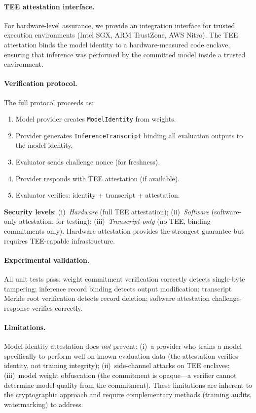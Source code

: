 \documentclass[11pt]{article}
\begin{document}
\paragraph{TEE attestation interface.}
For hardware-level assurance, we provide an integration interface
for trusted execution environments (Intel SGX, ARM TrustZone,
AWS Nitro).  The TEE attestation binds the model identity to a
hardware-measured code enclave, ensuring that inference was performed
by the committed model inside a trusted environment.

\paragraph{Verification protocol.}
The full protocol proceeds as:
\begin{enumerate}[nosep]
\item Model provider creates \texttt{ModelIdentity} from weights.
\item Provider generates \texttt{InferenceTranscript} binding
  all evaluation outputs to the model identity.
\item Evaluator sends challenge nonce (for freshness).
\item Provider responds with TEE attestation (if available).
\item Evaluator verifies: identity $+$ transcript $+$ attestation.
\end{enumerate}

\noindent\textbf{Security levels}: (i)~\emph{Hardware} (full TEE
attestation); (ii)~\emph{Software} (software-only attestation, for
testing); (iii)~\emph{Transcript-only} (no TEE, binding commitments
only).  Hardware attestation provides the strongest guarantee but
requires TEE-capable infrastructure.

\paragraph{Experimental validation.}
All unit tests pass: weight commitment verification correctly
detects single-byte tampering; inference record binding
detects output modification; transcript Merkle root verification
detects record deletion; software attestation challenge-response
verifies correctly.

\paragraph{Limitations.}
Model-identity attestation does \emph{not} prevent:
(i)~a provider who trains a model specifically to perform well
on known evaluation data (the attestation verifies identity,
not training integrity);
(ii)~side-channel attacks on TEE enclaves;
(iii)~model weight obfuscation (the commitment is opaque---a
verifier cannot determine model quality from the commitment).
These limitations are inherent to the cryptographic approach and
require complementary methods (training audits, watermarking)
to address.
\end{document}
